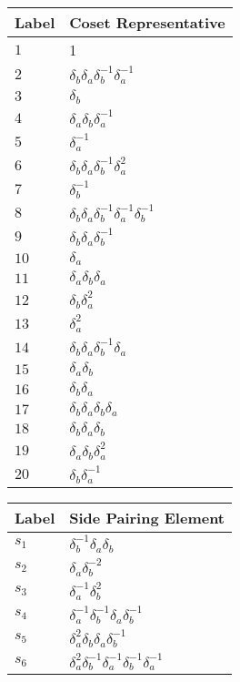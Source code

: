 \documentclass{article}
\begin{document}
\begin{center}
\begin{tabular}{ll}
\toprule
Label & Coset Representative\\
\midrule
$1$ & 1 \\
$2$ & $\delta_b^{}\delta_a^{}\delta_b^{-1}\delta_a^{-1}$ \\
$3$ & $\delta_b^{}$ \\
$4$ & $\delta_a^{}\delta_b^{}\delta_a^{-1}$ \\
$5$ & $\delta_a^{-1}$ \\
$6$ & $\delta_b^{}\delta_a^{}\delta_b^{-1}\delta_a^{2}$ \\
$7$ & $\delta_b^{-1}$ \\
$8$ & $\delta_b^{}\delta_a^{}\delta_b^{-1}\delta_a^{-1}\delta_b^{-1}$ \\
$9$ & $\delta_b^{}\delta_a^{}\delta_b^{-1}$ \\
$10$ & $\delta_a^{}$ \\
$11$ & $\delta_a^{}\delta_b^{}\delta_a^{}$ \\
$12$ & $\delta_b^{}\delta_a^{2}$ \\
$13$ & $\delta_a^{2}$ \\
$14$ & $\delta_b^{}\delta_a^{}\delta_b^{-1}\delta_a^{}$ \\
$15$ & $\delta_a^{}\delta_b^{}$ \\
$16$ & $\delta_b^{}\delta_a^{}$ \\
$17$ & $\delta_b^{}\delta_a^{}\delta_b^{}\delta_a^{}$ \\
$18$ & $\delta_b^{}\delta_a^{}\delta_b^{}$ \\
$19$ & $\delta_a^{}\delta_b^{}\delta_a^{2}$ \\
$20$ & $\delta_b^{}\delta_a^{-1}$ \\
\bottomrule
\end{tabular}
\hfill
\begin{tabular}{ll}
\toprule
Label & Side Pairing Element\\
\midrule
$s_{1}$ & $\delta_b^{-1}\delta_a^{}\delta_b^{}$ \\
$s_{2}$ & $\delta_a^{}\delta_b^{-2}$ \\
$s_{3}$ & $\delta_a^{-1}\delta_b^{2}$ \\
$s_{4}$ & $\delta_a^{-1}\delta_b^{-1}\delta_a^{}\delta_b^{-1}$ \\
$s_{5}$ & $\delta_a^{2}\delta_b^{}\delta_a^{}\delta_b^{-1}$ \\
$s_{6}$ & $\delta_a^{2}\delta_b^{-1}\delta_a^{-1}\delta_b^{-1}\delta_a^{-1}$ \\

\end{tabular}
\end{center}
\end{document}
